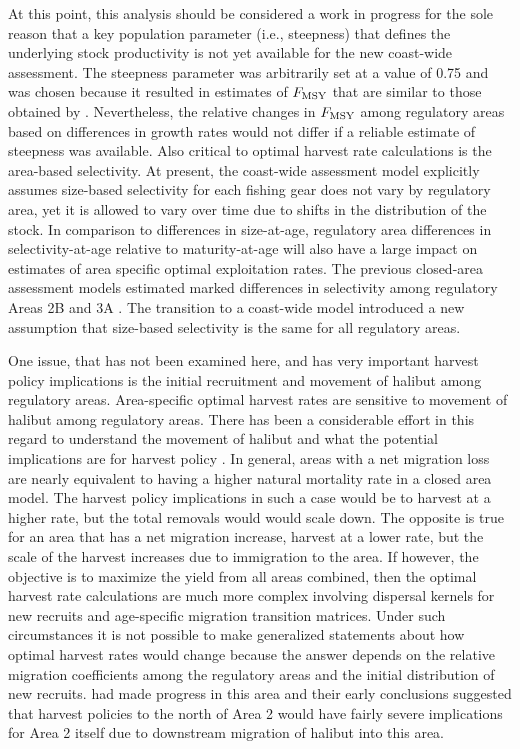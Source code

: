 At this point, this analysis should be considered a work in progress for the sole reason that a key population parameter (i.e., steepness) that defines the underlying stock productivity is not yet available for the new coast-wide assessment.  The steepness parameter was arbitrarily set at a value of 0.75 and was chosen because it resulted in estimates of $F_{\rm{MSY}}$ that are similar to those obtained by \cite{clark2006assessment}.  Nevertheless, the relative changes in $F_{\rm{MSY}}$ among regulatory areas based on differences in growth rates would not differ if a reliable estimate of steepness was available.  Also critical to optimal harvest rate calculations is the area-based selectivity.  At present, the coast-wide assessment model explicitly assumes size-based selectivity for each fishing gear does not vary by regulatory area, yet it is allowed to vary over time due to shifts in the distribution of the stock.  In comparison to differences in size-at-age, regulatory area differences in selectivity-at-age relative to maturity-at-age will also have a large impact on estimates of area specific optimal exploitation rates.  The previous closed-area assessment models estimated marked differences in selectivity among regulatory Areas 2B and 3A \citep{clark2006assessment}. The transition to a coast-wide model introduced a new assumption that size-based selectivity is the same for all regulatory areas.

 One issue, that has not been examined here, and has very important harvest policy implications is the initial recruitment and movement of halibut among regulatory areas. Area-specific optimal harvest rates are sensitive to movement of halibut among regulatory areas.  There has been a considerable effort in this regard to understand the movement of halibut \citep[e.g.,][]{loher2006seasonal,webster2009analysis} and what the potential implications are for harvest policy \citep{valero2009exploring,valero2010effect}.  In general, areas with a net migration loss are nearly equivalent to having a higher natural mortality rate in a closed area model.  The harvest policy implications in such a case would be to harvest at a higher rate, but the total removals would would scale down.  The opposite is true for an area that has a net migration increase, harvest at a lower rate, but the scale of the harvest increases due to immigration to the area.  If however, the objective is to maximize the yield from all areas combined, then the optimal harvest rate calculations are much more complex involving dispersal kernels for new recruits and age-specific migration transition matrices.  Under such circumstances it is not possible to make generalized statements about how optimal harvest rates would change because the answer depends on the relative migration coefficients among the regulatory areas and the initial distribution of new recruits.  \cite{valero2010effect} had made progress in this area and their early conclusions suggested that harvest policies to the north of Area 2 would have fairly severe implications for Area 2 itself due to downstream migration of halibut into this area.


